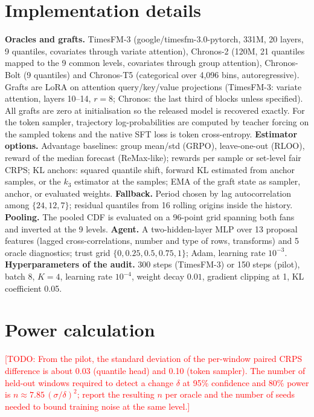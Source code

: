 \documentclass{article}
\newcommand{\todo}[1]{\textcolor{red}{[TODO: #1]}}
\begin{document}
\section{Implementation details}
\label{app:impl}
\textbf{Oracles and grafts.} TimesFM-3 (google/timesfm-3.0-pytorch, 331M, 20 layers, 9 quantiles, covariates through variate attention), Chronos-2 (120M, 21 quantiles mapped to the 9 common levels, covariates through group attention), Chronos-Bolt (9 quantiles) and Chronos-T5 (categorical over 4{,}096 bins, autoregressive). Grafts are LoRA on attention query/key/value projections (TimesFM-3: variate attention, layers 10--14, $r{=}8$; Chronos: the last third of blocks unless specified). All grafts are zero at initialisation so the released model is recovered exactly. For the token sampler, trajectory log-probabilities are computed by teacher forcing on the sampled tokens and the native SFT loss is token cross-entropy. \textbf{Estimator options.} Advantage baselines: group mean/std (GRPO), leave-one-out (RLOO), reward of the median forecast (ReMax-like); rewards per sample or set-level fair CRPS; KL anchors: squared quantile shift, forward KL estimated from anchor samples, or the $k_3$ estimator at the samples; EMA of the graft state as sampler, anchor, or evaluated weights. \textbf{Fallback.} Period chosen by lag autocorrelation among $\{24,12,7\}$; residual quantiles from 16 rolling origins inside the history. \textbf{Pooling.} The pooled CDF is evaluated on a 96-point grid spanning both fans and inverted at the 9 levels. \textbf{Agent.} A two-hidden-layer MLP over 13 proposal features (lagged cross-correlations, number and type of rows, transforms) and 5 oracle diagnostics; trust grid $\{0,0.25,0.5,0.75,1\}$; Adam, learning rate $10^{-3}$. \textbf{Hyperparameters of the audit.} 300 steps (TimesFM-3) or 150 steps (pilot), batch 8, $K{=}4$, learning rate $10^{-4}$, weight decay $0.01$, gradient clipping at 1, KL coefficient 0.05.

\section{Power calculation}
\label{app:power}
\todo{From the pilot, the standard deviation of the per-window paired CRPS difference is about 0.03 (quantile head) and 0.10 (token sampler). The number of held-out windows required to detect a change $\delta$ at 95\% confidence and 80\% power is $n\approx 7.85\,(\sigma/\delta)^2$; report the resulting $n$ per oracle and the number of seeds needed to bound training noise at the same level.}
\end{document}
